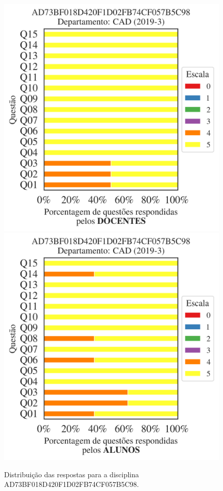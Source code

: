 \documentclass[a4paper,10pt]{article}
\begin{document}
\begin{figure}[h]
\centering
\includegraphics[width=0.485\linewidth]{analise_disciplina_departamento_CAD_AD73BF018D420F1D02FB74CF057B5C98_docentes.png}
\includegraphics[width=0.485\linewidth]{analise_disciplina_departamento_CAD_AD73BF018D420F1D02FB74CF057B5C98_alunos.png}
\caption{\label{fig:analise_geral_departamento}                Distribuição das respostas para a disciplina AD73BF018D420F1D02FB74CF057B5C98. }
\end{figure}
\end{document}
